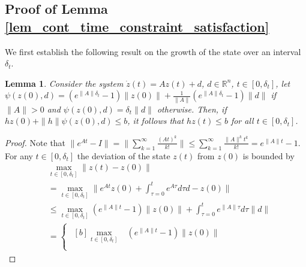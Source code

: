 \documentclass{IEEEtran}
\newtheorem{lemma}[theorem]{Lemma}
\begin{document}


    

\begin{appendices}


\section{Proof of Lemma \ref{lem_cont_time_constraint_satisfaction}}
\label{app_proof_lem_cont_time_constraint_satisfaction}
We first establish the following result on the growth of the state over an interval $\delta_t$.
\begin{lemma}                       
    Consider the system $\dot z(t)=Az(t) + d$, $d\in\mathbb{R}^n$, $t\in[0,\delta_t]$, let
    $\psi(z(0),d)=(e^{\|\!A\!\|\delta_t}\!-\!1)\|z(0)\|\!+\!\frac{1}{\|\!A\!\|}(e^{\|\!A\!\|\delta_t}\!-\!1) \|d\|$ if $\|A\|\!>\!0$ and $\psi(z(0),d) = \delta_t \|d\|$ otherwise. Then, if $hz(0)+\|h\|\psi(z(0),d)\leq b$, it follows that $hz(t)\leq b$ for all $t\in[0,\delta_t]$.
    \label{lem_ct_boundedness}
\end{lemma}
\begin{proof}
        Note that $\|e^{At}-I\| = \|\sum_{k=1}^{\infty}\frac{(At)^k}{k!}\|\leq\sum_{k=1}^{\infty}\frac{\|A\|^kt^k}{k!}=e^{\|A\|t}-1$. For any $t\in[0,\delta_t]$ the deviation of the state $z(t)$ from $z(0)$ is bounded by
    \begin{align*}
        &\max_{t\in[0,\delta_t]}\|z(t)-z(0)\|\\
        &= \max_{t\in[0,\delta_t]}\|e^{At}z(0) + \int_{\tau=0}^{t}e^{A\tau}d\tau d - z(0)\|
        \\
        &\leq \max_{t\in[0,\delta_t]}(e^{\|A\|t}\!-\!1)\|z(0)\|\!+\!\int_{\tau=0}^{t}e^{\|A\|\tau}d\tau \|d\| 
        \\&=\begin{cases}
            \begin{aligned}[b]
            \max_{t\in[0,\delta_t]}&(e^{\|A\|t}-1)\|z(0)\| \\

\end{aligned}
\end{cases}
\end{align*}
\end{proof}
\end{appendices}
\end{document}
